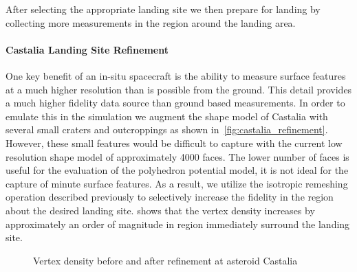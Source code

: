 \documentclass[letterpaper, paper,11pt]{AAS}		%
\begin{document}
After selecting the appropriate landing site we then prepare for landing by collecting more measurements in the region around the landing area.

\paragraph{Castalia Landing Site Refinement}
One key benefit of an in-situ spacecraft is the ability to measure surface features at a much higher resolution than is possible from the ground. 
This detail provides a much higher fidelity data source than ground based measurements. 
In order to emulate this in the simulation we augment the shape model of Castalia with several small craters and outcroppings as shown in~\cref{fig:castalia_refinement}.
However, these small features would be difficult to capture with the current low resolution shape model of approximately \num{4000} faces.
The lower number of faces is useful for the evaluation of the polyhedron potential model, it is not ideal for the capture of minute surface features. 
As a result, we utilize the isotropic remeshing operation described previously to selectively increase the fidelity in the region about the desired landing site.
 shows that the vertex density increases by approximately an order of magnitude in region immediately surround the landing site.
\begin{figure}[htbp]
    \centering
    \caption{Vertex density before and after refinement at asteroid Castalia\label{fig:castalia_refine_density}}
\end{figure}
\end{document}
